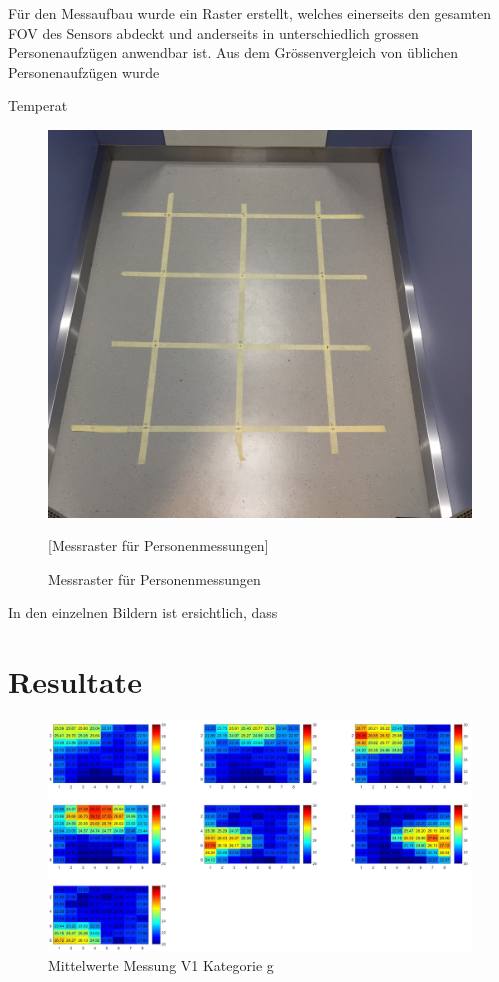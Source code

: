 Für den Messaufbau wurde ein Raster erstellt, welches einerseits den gesamten \ac{FOV} des Sensors abdeckt und anderseits in unterschiedlich grossen Personenaufzügen anwendbar ist. Aus dem Grössenvergleich von üblichen Personenaufzügen wurde



Temperat


\begin{figure}[H]
	\centering
	\includegraphics[width=1.0\textwidth, angle=0]{fig/Messraster.JPG}
	\caption{Messraster für Personenmessungen}[Messraster für Personenmessungen]
	\label{fig:p1gallpositionsmean}
\end{figure}

In den einzelnen Bildern ist ersichtlich, dass 

\section{Resultate}


\begin{figure}[H]
	\centering
	\includegraphics[width=1.0\textwidth]{fig/p1_g_Allpositions_mean}
	\caption[Mittelwerte Messung V1 Kategorie g]{Mittelwerte Messung V1 Kategorie g}
	\label{fig:p1gallpositionsmean}
\end{figure}

